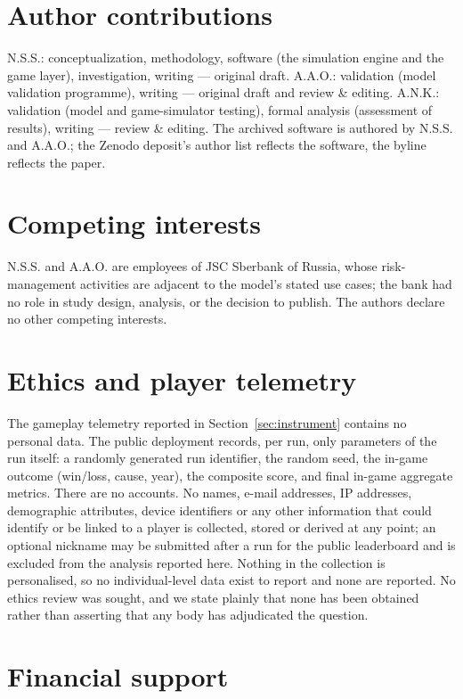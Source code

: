 \documentclass[12pt,a4paper]{article}
\begin{document}
\section*{Author contributions}

N.S.S.: conceptualization, methodology, software (the simulation engine and the game layer),
investigation, writing --- original draft. A.A.O.: validation (model validation programme),
writing --- original draft and review \& editing. A.N.K.: validation (model and game-simulator
testing), formal analysis (assessment of results), writing --- review \& editing. The archived
software is authored by N.S.S. and A.A.O.; the Zenodo deposit's author list reflects the
software, the byline reflects the paper.

\section*{Competing interests}

N.S.S. and A.A.O. are employees of JSC Sberbank of Russia, whose risk-management activities are
adjacent to the model's stated use cases; the bank had no role in study design, analysis, or the
decision to publish. The authors declare no other competing interests.

\section*{Ethics and player telemetry}

The gameplay telemetry reported in Section~\ref{sec:instrument} contains no personal data. The
public deployment records, per run, only parameters of the run itself: a randomly generated run
identifier, the random seed, the in-game outcome (win/loss, cause, year), the composite score,
and final in-game aggregate metrics. There are no accounts. No names, e-mail addresses, IP
addresses, demographic attributes, device identifiers or any other information that could
identify or be linked to a player is collected, stored or derived at any point; an optional
nickname may be submitted after a run for the public leaderboard and is excluded from the
analysis reported here. Nothing in the collection is personalised, so no individual-level data
exist to report and none are reported. No ethics review was sought, and we state plainly that
none has been obtained rather than asserting that any body has adjudicated the question.

\section*{Financial support}
\end{document}
